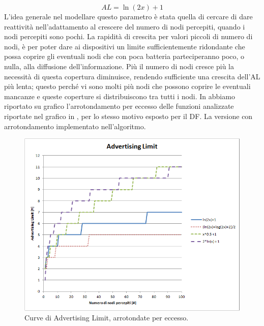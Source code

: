 \begin{equation}
	AL=\ln \left( 2\textit{x}\right) + 1 \nonumber
\end{equation}
L'idea generale nel modellare questo parametro è stata quella di cercare di dare reattività nell'adattamento al crescere del numero di nodi percepiti, quando i nodi percepiti sono pochi. La rapidità di crescita per valori piccoli di numero di nodi, è per poter dare ai  dispositivi un limite sufficientemente ridondante che possa coprire gli eventuali nodi che con poca batteria parteciperanno poco, o nulla, alla diffusione dell'informazione. Più il numero di nodi cresce più la necessità di questa copertura diminuisce, rendendo sufficiente una crescita dell'AL più lenta; questo perché vi sono molti più nodi che possono coprire le eventuali mancanze e queste coperture si distribuiscono tra tutti i nodi. In  abbiamo riportato su grafico l'arrotondamento per eccesso delle funzioni analizzate riportate nel grafico in , per lo stesso motivo esposto per il DF. La versione con arrotondamento implementato nell'algoritmo.

\begin{figure}[t]
	\centering
	\includegraphics[width=0.9\linewidth]{Images/grafici_usati/AL_curve_arr}
	\caption[Curve dell'AL (arrotondato)]{Curve di Advertising Limit, arrotondate per eccesso.}
	\label{fig:AL_curve_arr}
\end{figure}

